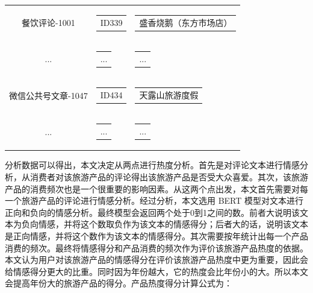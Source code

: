 \documentclass[bwprint]{gmcmthesis}
\begin{document}
\begin{center}
\begin{longtable}{c|c|c}
            餐饮评论-1001 & \begin{tabular}[c]{@{}c@{}}
              ID339
              \end{tabular} 
              & \begin{tabular}[c]{@{}l@{}}
                盛香烧鹅（东方市场店）
              \end{tabular} \\
              ... & \begin{tabular}[c]{@{}c@{}}
                ...
              \end{tabular} 
              & \begin{tabular}[c]{@{}l@{}}
                ...
              \end{tabular} \\
              微信公共号文章-1047 & \begin{tabular}[c]{@{}c@{}}
                ID434
                \end{tabular} 
                & \begin{tabular}[c]{@{}l@{}}
                  天露山旅游度假
                \end{tabular} \\
                ... & \begin{tabular}[c]{@{}c@{}}
                  ...
                \end{tabular} 
                & \begin{tabular}[c]{@{}l@{}}
                  ...
                \end{tabular} \\
      \hline
  \end{longtable}
  \end{center}

分析数据可以得出，本文决定从两点进行热度分析。首先是对评论文本进行情感分析，从消费者对该旅游产品的评论得出该旅游产品是否受大众喜爱。其次，该旅游产品的消费频次也是一个很重要的影响因素。从这两个点出发，本文首先需要对每一个旅游产品的评论进行情感分析。经过分析，本文选用 BERT 模型对文本进行正向和负向的情感分析。最终模型会返回两个处于0到1之间的数。前者大说明该文本为负向情感，并将这个数取负作为该文本的情感得分；后者大的话，说明该文本是正向情感，并将这个数作为该文本的情感得分。其次需要按年统计出每一个产品消费的频次。最终将情感得分和产品消费的频次作为评价该旅游产品热度的依据。本文认为用户对该旅游产品的情感得分在评价该旅游产品热度中更为重要，因此会给情感得分更大的比重。同时因为年份越大，它的热度会比年份小的大。所以本文会提高年份大的旅游产品的得分。产品热度得分计算公式为：
\end{document}
